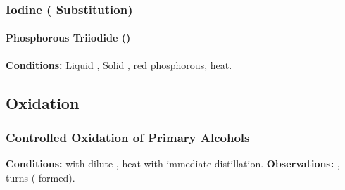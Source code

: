 


			\pagebreak
			\subsubsection{Iodine ( Substitution)}

				\paragraph{Phosphorous Triiodide ()}

				\vspace{1.5em}
				\vbox{\textbf{Conditions:}	\tabto{35mm}Liquid , 
											\tabto{35mm}Solid , {\color{Red}red} phosphorous, heat.}








		\pagebreak
		\subsection{Oxidation}

			\subsubsection{Controlled Oxidation of Primary Alcohols}

				\vspace{1.5em}
				\vbox{\textbf{Conditions:}	\tabto{35mm} with dilute ,
											\tabto{35mm}heat with immediate distillation.}
				\vspace{0.75em}
				\vbox{\textbf{Observations:}\tabto{35mm} , turns 
														( formed).}

